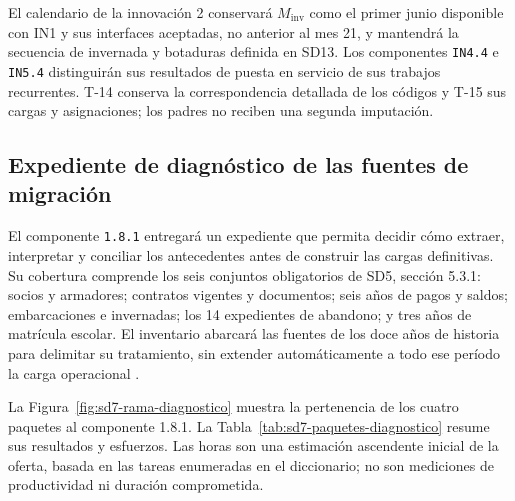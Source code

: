 El calendario de la innovación 2 conservará $M_{\mathrm{inv}}$ como el primer junio disponible con IN1 y sus interfaces aceptadas, no anterior al mes 21, y mantendrá la secuencia de invernada y botaduras definida en SD13. Los componentes \texttt{IN4.4} e \texttt{IN5.4} distinguirán sus resultados de puesta en servicio de sus trabajos recurrentes. T-14 conserva la correspondencia detallada de los códigos y T-15 sus cargas y asignaciones; los padres no reciben una segunda imputación.

\subsection{Expediente de diagnóstico de las fuentes de migración}
El componente \texttt{1.8.1} entregará un expediente que permita decidir cómo extraer, interpretar y conciliar los antecedentes antes de construir las cargas definitivas. Su cobertura comprende los seis conjuntos obligatorios de SD5, sección 5.3.1: socios y armadores; contratos vigentes y documentos; seis años de pagos y saldos; embarcaciones e invernadas; los 14 expedientes de abandono; y tres años de matrícula escolar. El inventario abarcará las fuentes de los doce años de historia para delimitar su tratamiento, sin extender automáticamente a todo ese período la carga operacional \parencite[cap.~15, RT-05.15, p.~34]{caso07}.

La Figura~\ref{fig:sd7-rama-diagnostico} muestra la pertenencia de los cuatro paquetes al componente 1.8.1. La Tabla~\ref{tab:sd7-paquetes-diagnostico} resume sus resultados y esfuerzos. Las horas son una estimación ascendente inicial de la oferta, basada en las tareas enumeradas en el diccionario; no son mediciones de productividad ni duración comprometida.

